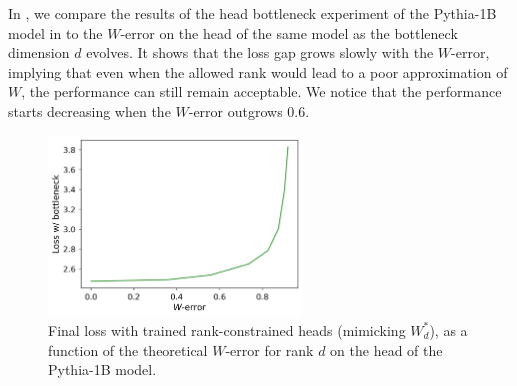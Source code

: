 In , we compare the results of the head bottleneck experiment of the Pythia-1B model in  to the $W$\!-error on the head of the same model as the bottleneck dimension $d$ evolves. It shows that the loss gap grows slowly with the $W$\!-error, implying that even when the allowed rank would lead to a poor approximation of $W$, the performance can still remain acceptable. We notice that the performance starts decreasing when the $W$\!-error outgrows 0.6.

\begin{figure}
\centering
    \includegraphics[width=0.6\textwidth]{sources/part_1/softmax_bottleneck/imgs/loss_v_werr.png}
    \caption{Final loss with trained rank-constrained heads (mimicking $W_d^*$), as a function of the theoretical $W$\!-error for rank $d$ on the head of the Pythia-1B model.}
    \label{fig:neg_res_thm}
\end{figure}






